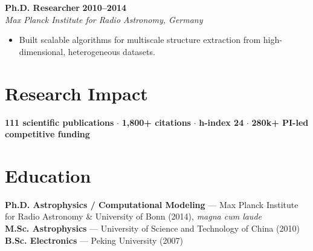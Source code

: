 \documentclass[10pt]{article}
\begin{document}
\textbf{Ph.D. Researcher} \hfill \textbf{2010--2014}\\
\textit{Max Planck Institute for Radio Astronomy, Germany}\\
\begin{itemize}
  \item Built scalable algorithms for multiscale structure extraction from high-dimensional,
        heterogeneous datasets.
\end{itemize}
\vspace{5pt}

\section*{Research Impact}
{\small \textbf{111 scientific publications} $\cdot$ \textbf{1,800+ citations} $\cdot$
\textbf{h-index 24} $\cdot$ \textbf{\texteuro280k+ PI-led competitive funding}}

\vspace{4pt}
\section*{Education}
\textbf{Ph.D. Astrophysics / Computational Modeling} --- Max Planck Institute for Radio Astronomy \&
University of Bonn (2014), \textit{magna cum laude}\\
\textbf{M.Sc. Astrophysics} --- University of Science and Technology of China (2010)\\
\textbf{B.Sc. Electronics} --- Peking University (2007)
\end{document}
